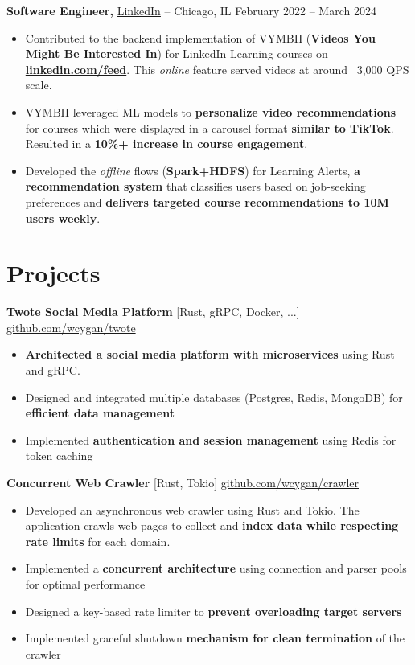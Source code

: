 \documentclass[11pt]{article}
\begin{document}
\textbf{Software Engineer,} \href{https://www.linkedin.com/}{LinkedIn} -- Chicago, IL \hfill February 2022 -- March 2024 \\
\vspace{-9pt}
\begin{itemize}
  \item Contributed to the backend implementation of VYMBII (\textbf{Videos You Might Be Interested In}) for LinkedIn Learning courses on \textbf{\href{https://linkedin.com/feed}{linkedin.com/feed}}. This \textit{online} feature served videos at around ~3,000 QPS scale.
  \item VYMBII leveraged ML models to \textbf{personalize video recommendations} for courses which were displayed in a carousel format \textbf{similar to TikTok}. Resulted in a \textbf{10\%+ increase in course engagement}.
  \item Developed the \textit{offline} flows (\textbf{Spark+HDFS}) for Learning Alerts, \textbf{a recommendation system} that classifies users based on job-seeking preferences and \textbf{delivers targeted course recommendations to 10M users weekly}. 
\end{itemize}

\vspace{-18.5pt}

\section*{Projects}
\textbf{Twote Social Media Platform} [Rust, gRPC, Docker, ...] \hfill \href{https://github.com/wcygan/twote}{github.com/wcygan/twote} \\
\vspace{-9pt}
\begin{itemize}
  \item \textbf{Architected a social media platform with microservices} using Rust and gRPC.
  \item Designed and integrated multiple databases {(Postgres, Redis, MongoDB) for \textbf{efficient data management}}
  \item Implemented \textbf{authentication and session management} using Redis for token caching
\end{itemize}

\textbf{Concurrent Web Crawler} [Rust, Tokio] \hfill \href{https://github.com/wcygan/crawler}{github.com/wcygan/crawler} \\
\vspace{-9pt}
\begin{itemize}

  \item Developed an asynchronous web crawler using Rust and Tokio. The application crawls web pages to collect and \textbf{index data while respecting rate limits} for each domain.
  \item Implemented a \textbf{concurrent architecture} using connection and parser pools for optimal performance
  \item Designed a key-based rate limiter to \textbf{prevent overloading target servers}
  \item Implemented graceful shutdown \textbf{mechanism for clean termination} of the crawler
\end{itemize}
\end{document}
